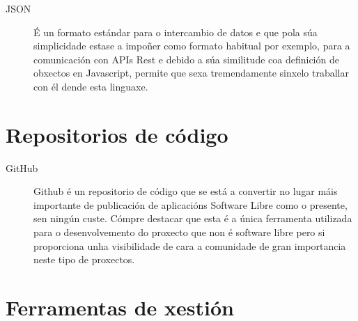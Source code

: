 
  \begin{description}
   \item [JSON] É un formato estándar para o intercambio de datos e que pola súa
simplicidade estase a impoñer como formato habitual por exemplo, para a comunicación con
APIs Rest e debido a súa similitude coa definición de obxectos en Javascript, permite que
sexa tremendamente sinxelo traballar con él dende esta linguaxe.
  \end{description}

  \section{Repositorios de código}


  \begin{description}
   \item [GitHub] Github é un repositorio de código que se está a convertir no lugar máis
importante de publicación de aplicacións Software Libre
como o presente, sen ningún custe.
  Cómpre destacar que esta é a única ferramenta utilizada para o desenvolvemento do
proxecto que non é software libre pero si proporciona unha visibilidade de cara a
comunidade de gran importancia neste tipo de proxectos.
  \end{description}

  \section{Ferramentas de xestión}


